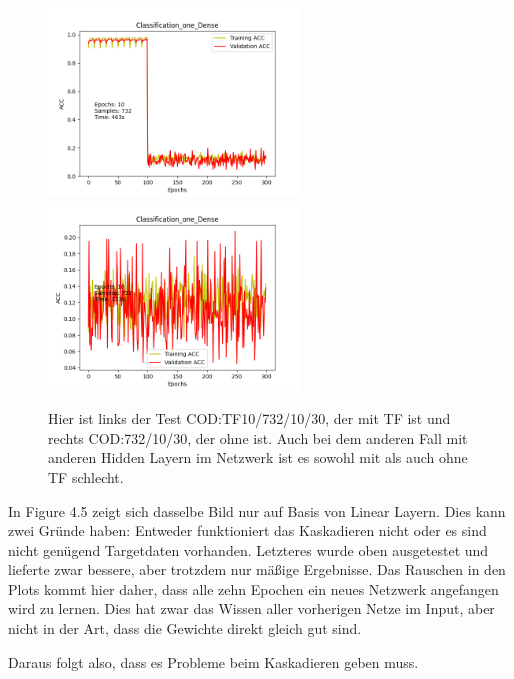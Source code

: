 \begin{figure}[htpb]
    \includegraphics[height=5cm]{../../Plots/ba_plots/classTF/cod_tr.png}
    \includegraphics[height=5cm]{../../Plots/ba_plots/classTF/wocod_tr.png}
    \caption{\label{fig:cod_tr} 
    \small{Hier ist links der Test COD:TF10/732/10/30, der mit TF ist und rechts COD:732/10/30, der ohne ist. Auch bei dem anderen Fall mit 
    anderen Hidden Layern im Netzwerk ist es sowohl mit als auch ohne TF schlecht.}}
\end{figure}

In Figure 4.5 zeigt sich dasselbe Bild nur auf Basis von Linear Layern. Dies kann zwei Gründe haben: Entweder funktioniert das Kaskadieren nicht 
oder es sind nicht genügend Targetdaten vorhanden. Letzteres wurde oben ausgetestet und lieferte zwar bessere, aber trotzdem nur mäßige Ergebnisse. 
Das Rauschen in den Plots kommt hier daher, dass alle zehn Epochen ein neues Netzwerk angefangen wird zu lernen. Dies hat zwar das Wissen aller 
vorherigen Netze im Input, aber nicht in der Art, dass die Gewichte direkt gleich gut sind. 

Daraus folgt also, dass es Probleme beim Kaskadieren geben muss. 
